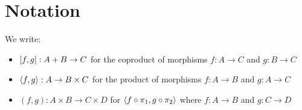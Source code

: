 \section{Notation}

We write:
\begin{itemize}
\item $[f, g]: A + B \to C$ for the coproduct of morphisms $f: A \to C$ and $g: B \to C$
\item $\langle f, g\rangle: A \to B \times C$ for the product of morphisms $f: A \to B$ and $g: A \to C$
\item $(f,g): A \times B \to C \times D$ for $\langle f \circ \pi_1, g \circ \pi_2\rangle$ where $f: A \to B$ and $g: C \to D$
\end{itemize}
